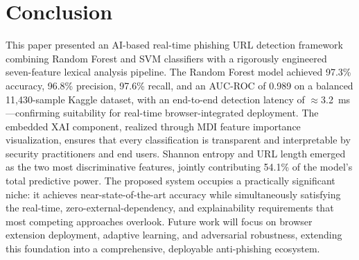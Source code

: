 \documentclass[conference]{IEEEtran}
\begin{document}
\section{Conclusion}
\label{sec:conclusion}

This paper presented an AI-based real-time phishing URL 
detection framework combining Random Forest and SVM classifiers 
with a rigorously engineered seven-feature lexical analysis 
pipeline. The Random Forest model achieved 97.3\% accuracy, 
96.8\% precision, 97.6\% recall, and an AUC-ROC of 0.989 on 
a balanced 11,430-sample Kaggle dataset, with an end-to-end 
detection latency of $\approx$3.2~ms—confirming suitability 
for real-time browser-integrated deployment. The embedded XAI 
component, realized through MDI feature importance 
visualization, ensures that every classification is 
transparent and interpretable by security practitioners and 
end users. Shannon entropy and URL length emerged as the two 
most discriminative features, jointly contributing 54.1\% of 
the model's total predictive power. The proposed system 
occupies a practically significant niche: it achieves 
near-state-of-the-art accuracy while simultaneously satisfying 
the real-time, zero-external-dependency, and explainability 
requirements that most competing approaches overlook. Future 
work will focus on browser extension deployment, adaptive 
learning, and adversarial robustness, extending this 
foundation into a comprehensive, deployable anti-phishing 
ecosystem.
\end{document}
